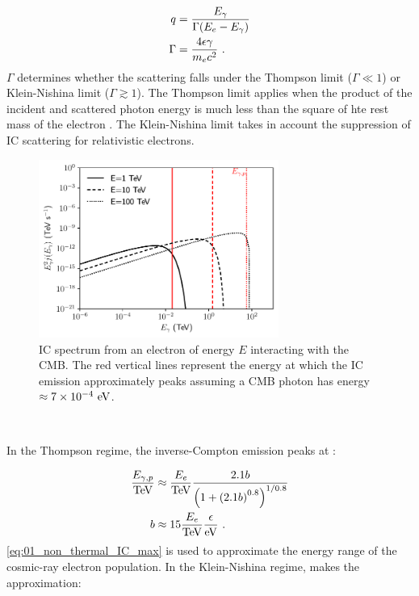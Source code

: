 \begin{subequations}
    \begin{align}
        q&=\frac{E_\gamma}{\Gamma\qty(E_e-E_\gamma)} \\
        \Gamma&=\frac{4\epsilon\gamma}{m_ec^2}\text{ .}
    \end{align}
\end{subequations}
\noindent $\Gamma$ determines whether the scattering falls under the Thompson limit ($\Gamma \ll 1$) or Klein-Nishina limit ($\Gamma \gtrsim 1$). The Thompson limit applies when the product of the incident and scattered photon energy is much less than the square of hte rest mass of the electron \citep{RevModPhys.42.237}. The Klein-Nishina limit  takes in account the suppression of IC scattering for relativistic electrons.
\begin{figure}
    \centering
    \includegraphics[width=0.7\textwidth]{04_Introduction/Images/non_thermal_emission/IC_spectrum.pdf}
    \caption{IC spectrum from an electron of energy $E$ interacting with the CMB.  The red vertical lines represent the energy at which the IC emission approximately peaks assuming a CMB photon has energy $\approx 7\times 10^{-4}~\si{\electronvolt}$.}
    \label{fig:01_IC_flux}
\end{figure}
\par~\par
In the Thompson regime, the inverse-Compton emission peaks at \citep{2009ARA&A..47..523H}:

\begin{equation}
	\begin{split}
		\frac{E_{\gamma,p}}{\TeV}&\approx \frac{E_e}{\TeV}\frac{2.1b}{\qty(1+\qty(2.1b)^{0.8})^{1/0.8}} \\
		b&\approx 15\frac{E_e}{\TeV}\frac{\epsilon}{\eV}\text{ .}
	\end{split} \label{eq:01_non_thermal_IC_max}
\end{equation}
\noindent \autoref{eq:01_non_thermal_IC_max} is used to approximate the energy range of the cosmic-ray electron population. In the Klein-Nishina regime, \cite{doi:10.1126/science.abg5137} makes the approximation:

